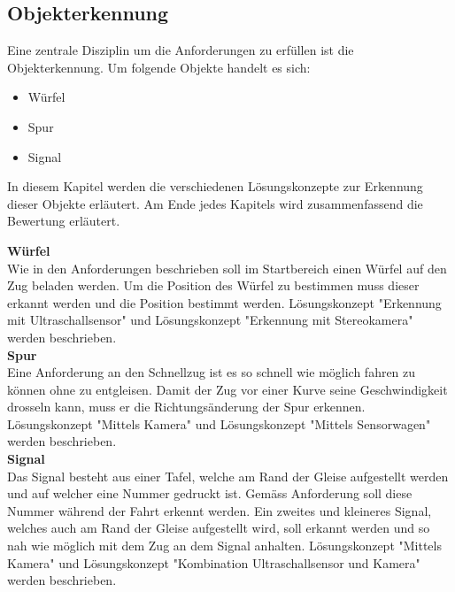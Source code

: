 \documentclass[../../main.tex]{subfiles}
\begin{document}
    \subsection{Objekterkennung}
    Eine zentrale Disziplin um die Anforderungen zu erfüllen ist die Objekterkennung. Um folgende Objekte handelt es sich:

    \begin{itemize}
        \item Würfel
        \item Spur
        \item Signal
    \end{itemize}
    \vspace{0.5cm}

    In diesem Kapitel werden die verschiedenen Lösungskonzepte zur Erkennung dieser Objekte erläutert. Am Ende jedes Kapitels wird zusammenfassend die Bewertung erläutert.

    \textbf{Würfel}\\
    Wie in den Anforderungen beschrieben soll im Startbereich einen Würfel auf den Zug beladen werden. Um die Position des Würfel zu bestimmen muss dieser erkannt werden
    und die Position bestimmt werden. Lösungskonzept "Erkennung mit Ultraschallsensor" und Lösungskonzept "Erkennung mit Stereokamera" werden beschrieben.\\

    \textbf{Spur}\\
    Eine Anforderung an den Schnellzug ist es so schnell wie möglich fahren zu können ohne zu entgleisen. Damit der Zug vor einer Kurve seine Geschwindigkeit
    drosseln kann, muss er die Richtungsänderung der Spur erkennen. Lösungskonzept "Mittels Kamera" und Lösungskonzept "Mittels Sensorwagen" werden beschrieben.\\

    \textbf{Signal}\\
    Das Signal besteht aus einer Tafel, welche am Rand der Gleise aufgestellt werden und auf welcher eine Nummer gedruckt ist. Gemäss Anforderung soll diese Nummer
    während der Fahrt erkennt werden. Ein zweites und kleineres Signal, welches auch am Rand der Gleise aufgestellt wird, soll erkannt werden und so nah wie möglich 
    mit dem Zug an dem Signal anhalten. Lösungskonzept "Mittels Kamera" und Lösungskonzept "Kombination Ultraschallsensor und Kamera" werden beschrieben.
\end{document}
